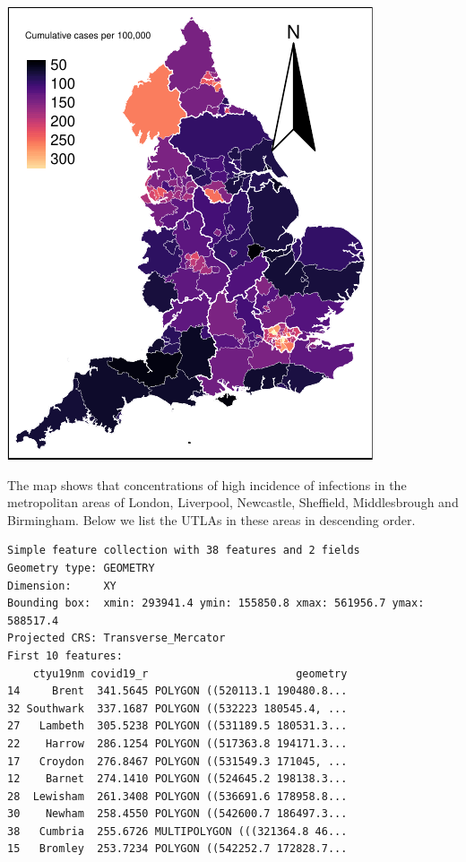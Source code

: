 \documentclass[
  letterpaper,
  DIV=11,
  numbers=noendperiod,
  oneside]{scrreprt}
\newenvironment{Shaded}{\begin{snugshade}}{\end{snugshade}}
\newcommand{\DecValTok}[1]{\textcolor[rgb]{0.68,0.00,0.00}{#1}}
\newcommand{\FunctionTok}[1]{\textcolor[rgb]{0.28,0.35,0.67}{#1}}
\newcommand{\NormalTok}[1]{\textcolor[rgb]{0.00,0.23,0.31}{#1}}
\newcommand{\OtherTok}[1]{\textcolor[rgb]{0.00,0.23,0.31}{#1}}
\newcommand{\SpecialCharTok}[1]{\textcolor[rgb]{0.37,0.37,0.37}{#1}}
\begin{document}
\includegraphics{09-gwr_files/figure-pdf/unnamed-chunk-4-1.pdf}

The map shows that concentrations of high incidence of infections in the
metropolitan areas of London, Liverpool, Newcastle, Sheffield,
Middlesbrough and Birmingham. Below we list the UTLAs in these areas in
descending order.

\begin{Shaded}
\end{Shaded}

\begin{verbatim}
Simple feature collection with 38 features and 2 fields
Geometry type: GEOMETRY
Dimension:     XY
Bounding box:  xmin: 293941.4 ymin: 155850.8 xmax: 561956.7 ymax: 588517.4
Projected CRS: Transverse_Mercator
First 10 features:
    ctyu19nm covid19_r                       geometry
14     Brent  341.5645 POLYGON ((520113.1 190480.8...
32 Southwark  337.1687 POLYGON ((532223 180545.4, ...
27   Lambeth  305.5238 POLYGON ((531189.5 180531.3...
22    Harrow  286.1254 POLYGON ((517363.8 194171.3...
17   Croydon  276.8467 POLYGON ((531549.3 171045, ...
12    Barnet  274.1410 POLYGON ((524645.2 198138.3...
28  Lewisham  261.3408 POLYGON ((536691.6 178958.8...
30    Newham  258.4550 POLYGON ((542600.7 186497.3...
38   Cumbria  255.6726 MULTIPOLYGON (((321364.8 46...
15   Bromley  253.7234 POLYGON ((542252.7 172828.7...
\end{verbatim}
\end{document}
